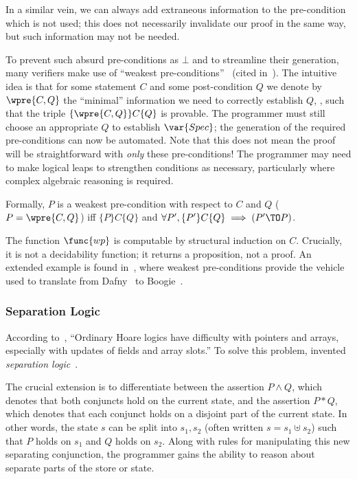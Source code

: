 In a similar vein, we can always add extraneous information to the pre-condition
which is not used; this does not necessarily invalidate our proof in the same
way, but such information may not be needed.

To prevent such absurd pre-conditions as \(\bot\) and to streamline their
generation, many verifiers make use of ``weakest
pre-conditions''~\cite{dijkstra1976discipline,Nelson_1989} (cited
in~\cite{leino2008specification}). The intuitive idea is that for some statement
\(C\) and some post-condition \(Q\) we denote by \(\wpre{C, Q}\) the ``minimal''
information we need to correctly establish \(Q\), \ie, such that the triple
\(\{\wpre{C,Q}\} C \{Q\}\) is provable. The programmer must still choose an
appropriate \(Q\) to establish \(\var{Spec}\); the generation of the required
pre-conditions can now be automated. Note that this does not mean the proof will
be straightforward with \emph{only} these pre-conditions! The programmer may
need to make logical leaps to strengthen conditions as necessary, particularly
where complex algebraic reasoning is required.

Formally, \(P\) is a weakest pre-condition with respect to \(C\) and \(Q\) (\(P
= \wpre{C,Q}\)) iff \(\{P\} C \{Q\}\) and \(\forall P', \{P'\} C \{Q\} \implies
(P' \TO P)\).

The function \(\func{wp}\) is computable by structural induction on
\(C\). Crucially, it is not a decidability function; it returns a proposition,
not a proof. An extended example is found in~\cite[\S 3]{leino2008specification},
where weakest pre-conditions provide the vehicle used to translate from
Dafny~\cite{leino2010dafny} to Boogie~\cite{Barnett_2006,leino2008this}.

\subsubsection{Separation Logic}

According to~\cite[\S 5]{Appel_2011}, ``Ordinary Hoare logics have difficulty
with pointers and arrays, especially with updates of fields and array slots.''
To solve this problem, \citeauthor{Reynolds} invented \emph{separation
logic}~\cite{Reynolds}.

The crucial extension is to differentiate between the assertion \(P \land Q\),
which denotes that both conjuncts hold on the current state, and the assertion
\(P * Q\), which denotes that each conjunct holds on a disjoint part of the
current state. In other words, the state \(s\) can be split into \(s_1, s_2\)
(often written \(s = s_1 \uplus s_2\)) such that \(P\) holds on \(s_1\) and
\(Q\) holds on \(s_2\). Along with rules for manipulating this new separating
conjunction, the programmer gains the ability to reason about separate parts of
the store or state.

